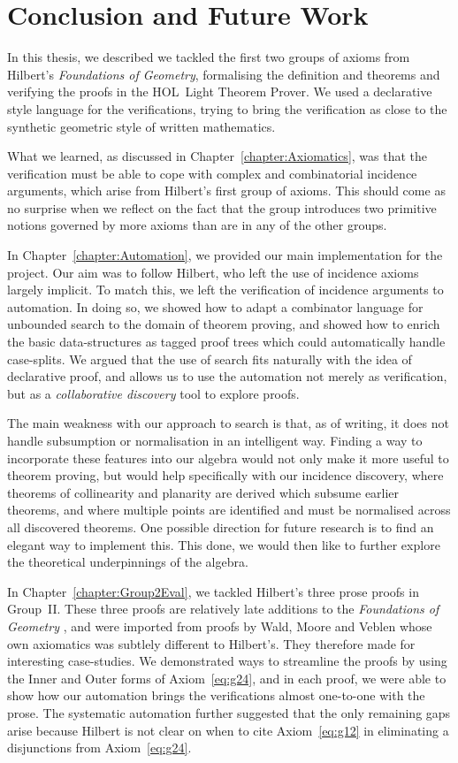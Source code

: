 \chapter{Conclusion and Future Work}\label{chapter:Conclusion}
In this thesis, we described we tackled the first two groups of axioms from Hilbert's \emph{Foundations of Geometry}, formalising the definition and theorems and verifying the proofs in the HOL~Light Theorem Prover. We used a declarative style language for the verifications, trying to bring the verification as close to the synthetic geometric style of written mathematics.

What we learned, as discussed in Chapter~\ref{chapter:Axiomatics}, was that the verification must be able to cope with complex and combinatorial incidence arguments, which arise from Hilbert's first group of axioms. This should come as no surprise when we reflect on the fact that the group introduces two primitive notions governed by more axioms than are in any of the other groups. 

In Chapter~\ref{chapter:Automation}, we provided our main implementation for the project. Our aim was to follow Hilbert, who left the use of incidence axioms largely implicit. To match this, we left the verification of incidence arguments to automation. In doing so, we showed how to adapt a combinator language for unbounded search to the domain of theorem proving, and showed how to enrich the basic data-structures as tagged proof trees which could automatically handle case-splits. We argued that the use of search fits naturally with the idea of declarative proof, and allows us to use the automation not merely as verification, but as a \emph{collaborative discovery} tool to explore proofs.

The main weakness with our approach to search is that, as of writing, it does not handle subsumption or normalisation in an intelligent way. Finding a way to incorporate these features into our algebra would not only make it more useful to theorem proving, but would help specifically with our incidence discovery, where theorems of collinearity and planarity are derived which subsume earlier theorems, and where multiple points are identified and must be normalised across all discovered theorems. One possible direction for future research is to find an elegant way to implement this. This done, we would then like to further explore the theoretical underpinnings of the algebra.

In Chapter~\ref{chapter:Group2Eval}, we tackled Hilbert's three prose proofs in Group~II. These three proofs are relatively late additions to the \emph{Foundations of Geometry} , and were imported from proofs by Wald, Moore and Veblen whose own axiomatics was subtlely different to Hilbert's. They therefore made for interesting case-studies. We demonstrated ways to streamline the proofs by using the Inner and Outer forms of Axiom~\ref{eq:g24}, and in each proof, we were able to show how our automation brings the verifications almost one-to-one with the prose. The systematic automation further suggested that the only remaining gaps arise because Hilbert is not clear on when to cite Axiom~\ref{eq:g12} in eliminating a disjunctions from Axiom~\ref{eq:g24}. 

